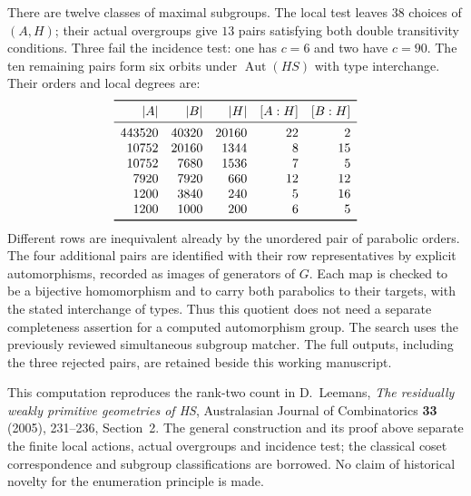 \documentclass[11pt]{article}
\newcommand{\Aut}{\operatorname{Aut}}
\begin{document}
There are twelve classes of maximal subgroups. The local test leaves
$38$ choices of $(A,H)$; their actual overgroups give $13$ pairs satisfying
both double transitivity conditions. Three fail the incidence test: one
has $c=6$ and two have $c=90$. The ten remaining pairs form six orbits
under $\Aut(HS)$ with type interchange. Their orders and local degrees are:
\[
\begin{array}{rrrrr}
\toprule
|A|&|B|&|H|&[A:H]&[B:H]\\
\midrule
443520&40320&20160&22&2\\
10752&20160&1344&8&15\\
10752&7680&1536&7&5\\
7920&7920&660&12&12\\
1200&3840&240&5&16\\
1200&1000&200&6&5\\
\bottomrule
\end{array}
\]
Different rows are inequivalent already by the unordered pair of parabolic
orders. The four additional pairs are identified with their row representatives
by explicit automorphisms, recorded as images of generators of $G$. Each
map is checked to be a bijective homomorphism and to carry both parabolics
to their targets, with the stated interchange of types. Thus this quotient
does not need a separate completeness assertion for a computed automorphism
group. The search uses the previously reviewed simultaneous subgroup matcher.
The full outputs, including the three rejected pairs, are retained beside
this working manuscript.

This computation reproduces the rank-two count in D.~Leemans,
\emph{The residually weakly primitive geometries of HS}, Australasian
Journal of Combinatorics \textbf{33} (2005), 231--236, Section~2.
The general construction and its proof above separate the finite local
actions, actual overgroups and incidence test; the classical coset
correspondence and subgroup classifications are borrowed. No claim of
historical novelty for the enumeration principle is made.
\end{document}
